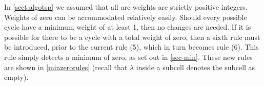 
In \autoref{sect:algotsp} we assumed that all arc weights are strictly positive integers.  Weights of zero can be accommodated relatively easily.  Should every possible cycle have a minimum weight of at least 1, then no changes are needed.  If it is possible for there to be a cycle with a total weight of zero, then a sixth rule must be introduced, prior to the current rule (5), which in turn becomes rule (6).  This rule simply detects a minimum of zero, as set out in \autoref{sec-min}.  These new rules are shown in \autoref{minzerorules} (recall that \(\lambda\) inside a subcell denotes the subcell as empty).

